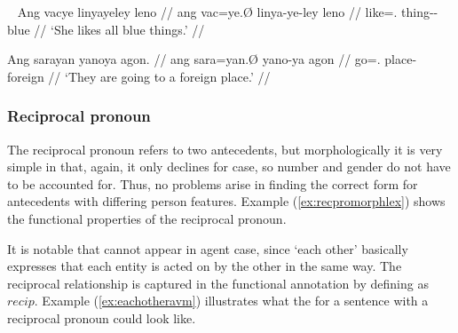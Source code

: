 \pex~\label{ex:indefproadjgennoun}
\a\begingl
	\gla Ang vacye linyayeley leno //
	\glb ang vac=ye.Ø linya-ye-ley leno //
	\glc \AgtT{} like=\TsgF{}.\Top{} thing-\Pl{}-\PargI{} blue //
	\glft `She likes all blue things.' //
\endgl

\a\begingl
	\gla Ang sarayan yanoya agon. //
	\glb ang sara=yan.Ø yano-ya agon //
	\glc \AgtT{} go=\TplM{}.\Top{} place-\Loc{} foreign //
	\glft `They are going to a foreign place.' //
\endgl
\xe

\subsubsection{Reciprocal pronoun}

The reciprocal pronoun  refers to two
antecedents, but morphologically it is very simple in that, again, it only
declines for case, so number and gender do not have to be accounted for. Thus,
no problems arise in finding the correct form for antecedents with differing
person features. Example (\ref{ex:recpromorphlex}) shows the functional
properties of the reciprocal pronoun.

\begin{morphlex}
\ex\label{ex:recpromorphlex}
\xe
\end{morphlex}

It is notable that  cannot appear in agent case, since
`each other' basically expresses that each entity is acted on by the other in
the same way. The reciprocal relationship is captured in the functional
annotation by defining \Prontype{} as $recip$. Example 
(\ref{ex:eachotheravm}) illustrates what the \Avm{} for a sentence with a
reciprocal pronoun could look like.

